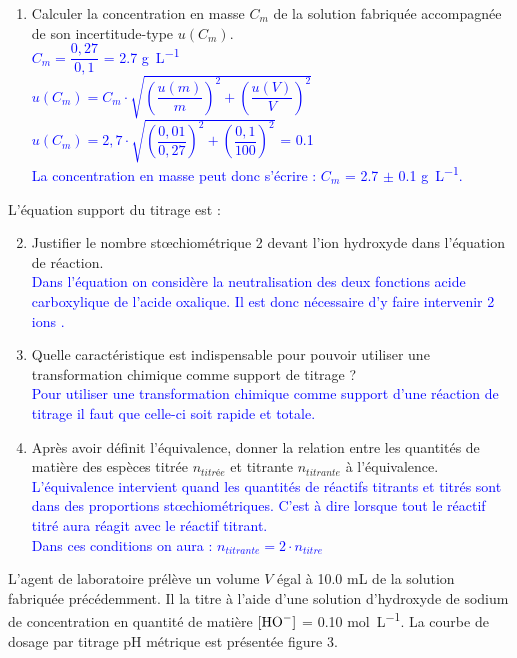 \documentclass[a4paper,11pt]{article}
\begin{document}
\begin{enumerate}
    \item Calculer la concentration en masse $C_m$ de la solution fabriquée accompagnée de son incertitude-type $u(C_m)$.\\
    \textcolor{blue}{$C_m = \dfrac{0,27}{0,1}$ = \num{2,7} \unit{\gram\per\liter}\\
    $u(C_m) = C_m \cdot \sqrt{\left( \dfrac{u(m)}{m}\right)^2 + \left( \dfrac{u(V)}{V}\right)^2}$\\
     $u(C_m) = 2,7 \cdot \sqrt{\left( \dfrac{0,01}{0,27}\right)^2 + \left( \dfrac{0,1}{100}\right)^2}$ = \num{0,1}\\
    La concentration en masse peut donc s'écrire : $C_m$ = \num{2,7} $\pm$ \num{0,1} \unit{\gram\per\liter}.}
\end{enumerate}
L'équation support du titrage est : 
\begin{enumerate}
\setcounter{enumi}{1}
    \item Justifier le nombre st\oe chiométrique 2 devant l'ion hydroxyde dans l'équation de réaction.\\
    \textcolor{blue}{Dans l'équation on considère la neutralisation des deux fonctions acide carboxylique de l'acide oxalique. Il est donc nécessaire d'y faire intervenir 2 ions .}
    \item Quelle caractéristique est indispensable pour pouvoir utiliser une transformation chimique comme support de titrage ?\\
    \textcolor{blue}{Pour utiliser une transformation chimique comme support d'une réaction de titrage il faut que celle-ci soit rapide et totale.}
    \item Après avoir définit l'équivalence, donner la relation entre les quantités de matière des espèces titrée $n_{titrée}$ et titrante $n_{titrante}$ à l'équivalence.\\
    \textcolor{blue}{L'équivalence intervient quand les quantités de réactifs titrants et titrés sont dans des proportions st\oe chiométriques. C'est à dire lorsque tout le réactif titré aura réagit avec le réactif titrant.\\ Dans ces conditions on aura : $n_{titrante} = 2 \cdot n_{titre}$}
\end{enumerate}
L'agent de laboratoire prélève un volume $V$ égal à \num{10,0} \unit{\milli\liter} de la solution fabriquée précédemment. Il la titre à l'aide d'une solution d'hydroxyde de sodium de concentration en quantité de matière $[\ce{HO-}]$ = \num{0,10} \unit{\mole\per\liter}. La courbe de dosage par titrage pH métrique est présentée figure 3.
\end{document}
